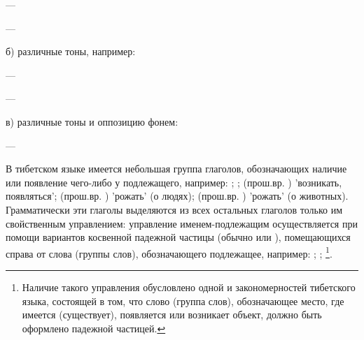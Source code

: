 \begin{description}
	\item{} --- 
	\item{} --- 
\end{description}

б) различные тоны, например:

\begin{description}
	\item{} --- 
	\item{} --- 
\end{description}

в) различные тоны и оппозицию фонем:

\begin{description}
	\item{} --- 
\end{description}

В тибетском языке имеется небольшая группа глаголов,
обозначающих наличие или появление чего-либо у подлежащего, например:
;
;
 (прош.вр. ) 'возникать, появляться';
 (прош.вр. ) 'рожать' (о людях);
 (прош.вр. ) 'рожать' (о животных).
Грамматически эти глаголы выделяются из всех остальных глаголов только им свойственным управлением: управление именем-подлежащим осуществляется при помощи вариантов косвенной падежной частицы (обычно  или ), помещающихся справа от слова (группы слов), обозначающего подлежащее, например:
;
;
\footnote[34]{Наличие такого управления обусловлено одной и закономерностей тибетского языка, состоящей в том, что слово (группа слов), обозначающее место, где имеется (существует), появляется или возникает объект, должно быть оформлено падежной частицей.}.

